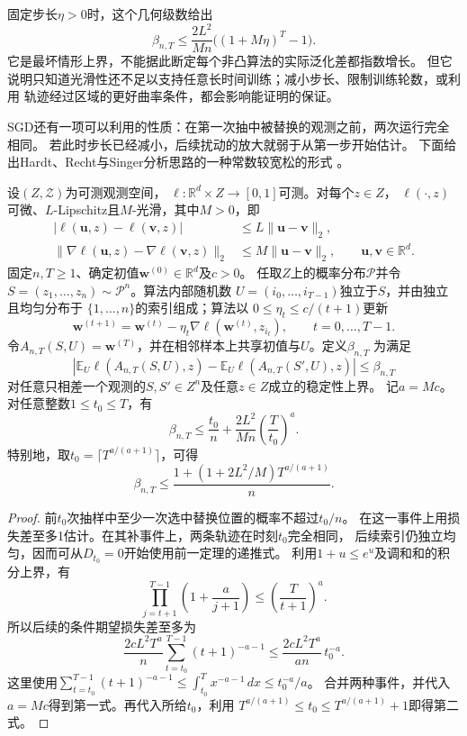 固定步长$\eta>0$时，这个几何级数给出
\[
 \beta_{n,T}\leq\frac{2L^2}{Mn}\bigl((1+M\eta)^T-1\bigr).
\]
它是最坏情形上界，不能据此断定每个非凸算法的实际泛化差都指数增长。
但它说明只知道光滑性还不足以支持任意长时间训练；减小步长、限制训练轮数，或利用
轨迹经过区域的更好曲率条件，都会影响能证明的保证。

SGD还有一项可以利用的性质：在第一次抽中被替换的观测之前，两次运行完全相同。
若此时步长已经减小，后续扰动的放大就弱于从第一步开始估计。
下面给出Hardt、Recht与Singer分析思路的一种常数较宽松的形式
。

\begin{theorem}[递减步长的非凸SGD泛化界]
\label{thm:nonconvex-sgd-decay}
设$(Z,\mathcal Z)$为可测观测空间，
$\ell:\mathbb R^d\times Z\to[0,1]$可测。对每个$z\in Z$，
$\ell(\cdot,z)$可微、$L$-Lipschitz且$M$-光滑，其中$M>0$，即
\[
\begin{aligned}
 |\ell(\bm u,z)-\ell(\bm v,z)|
 &\leq L\|\bm u-\bm v\|_2,\\
 \|\nabla\ell(\bm u,z)-\nabla\ell(\bm v,z)\|_2
 &\leq M\|\bm u-\bm v\|_2,
 \qquad \bm u,\bm v\in\mathbb R^d.
\end{aligned}
\]
固定$n,T\geq1$、确定初值$\bm w^{(0)}\in\mathbb R^d$及$c>0$。
任取$Z$上的概率分布$\mathcal P$并令
$S=(z_1,\ldots,z_n)\sim\mathcal P^n$。算法内部随机数
$U=(i_0,\ldots,i_{T-1})$独立于$S$，并由独立且均匀分布于
$\{1,\ldots,n\}$的索引组成；算法以
$0\leq\eta_t\leq c/(t+1)$更新
\[
 \bm w^{(t+1)}
 =\bm w^{(t)}-\eta_t\nabla\ell(\bm w^{(t)},z_{i_t}),
 \qquad t=0,\ldots,T-1.
\]
令$A_{n,T}(S,U)=\bm w^{(T)}$，并在相邻样本上共享初值与$U$。定义$\beta_{n,T}$
为满足
\[
 \left|\mathbb E_U\ell(A_{n,T}(S,U),z)
 -\mathbb E_U\ell(A_{n,T}(S',U),z)\right|\leq\beta_{n,T}
\]
对任意只相差一个观测的$S,S'\in Z^n$及任意$z\in Z$成立的稳定性上界。
记$a=Mc$。对任意整数$1\leq t_0\leq T$，有
\[
 \beta_{n,T}\leq\frac{t_0}{n}
       +\frac{2L^2}{Mn}\left(\frac{T}{t_0}\right)^a.
\]
特别地，取$t_0=\lceil T^{a/(a+1)}\rceil$，可得
\[
 \beta_{n,T}\leq
 \frac{1+(1+2L^2/M)T^{a/(a+1)}}{n}.
\]
\end{theorem}
\begin{proof}
前$t_0$次抽样中至少一次选中替换位置的概率不超过$t_0/n$。
在这一事件上用损失差至多1估计。在其补事件上，两条轨迹在时刻$t_0$完全相同，
后续索引仍独立均匀，因而可从$D_{t_0}=0$开始使用前一定理的递推式。
利用$1+u\leq e^u$及调和和的积分上界，有
\[
 \prod_{j=t+1}^{T-1}\left(1+\frac a{j+1}\right)
 \leq\left(\frac T{t+1}\right)^a.
\]
所以后续的条件期望损失差至多为
\[
 \frac{2cL^2T^a}{n}\sum_{t=t_0}^{T-1}(t+1)^{-a-1}
 \leq\frac{2cL^2T^a}{an}\,t_0^{-a}.
\]
这里使用$\sum_{t=t_0}^{T-1}(t+1)^{-a-1}\leq\int_{t_0}^{T}x^{-a-1}\,dx\leq t_0^{-a}/a$。
合并两种事件，并代入$a=Mc$得到第一式。再代入所给$t_0$，利用
$T^{a/(a+1)}\leq t_0\leq T^{a/(a+1)}+1$即得第二式。
\end{proof}

